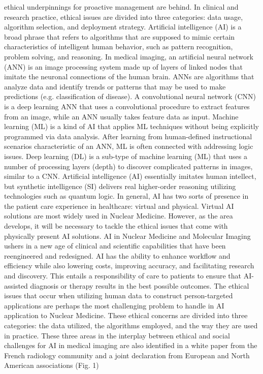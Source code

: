 \documentclass[12pt]{article}
\begin{document}
ethical underpinnings for proactive management are behind. In clinical and research practice, ethical issues are
divided into three categories: data usage, algorithm selection, and deployment strategy. Artificial intelligence (AI) is a broad phrase that refers to algorithms that are supposed to mimic certain
characteristics of intelligent human behavior, such as pattern recognition, problem solving, and reasoning. In
medical imaging, an artificial neural network (ANN) is an image processing system made up of layers of linked
nodes that imitate the neuronal connections of the human brain. ANNs are algorithms that analyze data and
identify trends or patterns that may be used to make predictions (e.g. classification of disease). A convolutional
neural network (CNN) is a deep learning ANN that uses a convolutional procedure to extract features from an
image, while an ANN usually takes feature data as input. Machine learning (ML) is a kind of AI that applies ML techniques without being explicitly programmed via data
analysis. After learning from human-defined instructional scenarios characteristic of an ANN, ML is often
connected with addressing logic issues. Deep learning (DL) is a sub-type of machine learning (ML) that uses a
number of processing layers (depth) to discover complicated patterns in images, similar to a CNN. Artificial
intelligence (AI) essentially imitates human intellect, but synthetic intelligence (SI) delivers real higher-order
reasoning utilizing technologies such as quantum logic. In general, AI has two sorts of presence in the patient
care experience in healthcare: virtual and physical. Virtual AI solutions are most widely used in Nuclear
Medicine. However, as the area develops, it will be necessary to tackle the ethical issues that come with
physically present AI solutions. AI in Nuclear Medicine and Molecular Imaging ushers in a new age of clinical and scientific capabilities that have
been reengineered and redesigned. AI has the ability to enhance workflow and efficiency while also lowering
costs, improving accuracy, and facilitating research and discovery. This entails a responsibility of care to patients
to ensure that AI-assisted diagnosis or therapy results in the best possible outcomes. The ethical issues that
occur when utilizing human data to construct person-targeted applications are perhaps the most challenging
problem to handle in AI application to Nuclear Medicine. These ethical concerns are divided into three categories: the data utilized, the algorithms employed, and the
way they are used in practice. These three areas in the interplay between ethical and social challenges for AI in
medical imaging are also identified in a white paper from the French radiology community and a joint
declaration from European and North American associations (Fig. 1)\\
\end{document}
